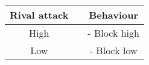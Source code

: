 \documentclass{article}
\begin{document}
\begin{landscape}

\begin{table}[h!]
  \begin{center}
    \begin{tabular*}{5cm}{c|c|c}
      \textbf{Rival attack} & \textbf{} & \textbf{Behaviour}\\
      \hline
      High & & - Block high\\
      \hline
      Low & & - Block low\\
      \hline
        \end{tabular*}
  \end{center}
\end{table}

\end{landscape}

\newpage
\end{document}
